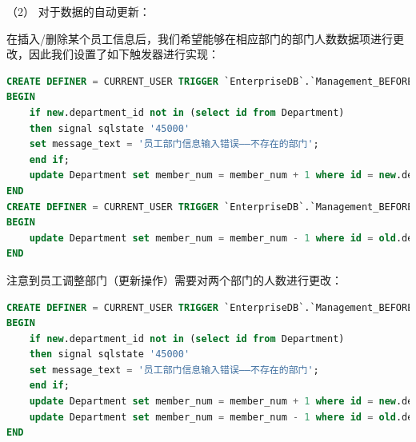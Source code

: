 \documentclass[withoutpreface,bwprint]{cumcmthesis} %
\newcommand{\kuohao}[1]{ \noindent （#1）}
\begin{document}
\vspace{1em}
\kuohao{2} 对于数据的自动更新：

在插入/删除某个员工信息后，我们希望能够在相应部门的部门人数数据项进行更改，因此我们设置了如下触发器进行实现：
\begin{lstlisting}[language=SQL]
CREATE DEFINER = CURRENT_USER TRIGGER `EnterpriseDB`.`Management_BEFORE_INSERT` BEFORE INSERT ON `Management` FOR EACH ROW
BEGIN
	if new.department_id not in (select id from Department)
	then signal sqlstate '45000'
    set message_text = '员工部门信息输入错误——不存在的部门';
	end if;
    update Department set member_num = member_num + 1 where id = new.department_id;
END
CREATE DEFINER = CURRENT_USER TRIGGER `EnterpriseDB`.`Management_BEFORE_DELETE` BEFORE DELETE ON `Management` FOR EACH ROW
BEGIN
	update Department set member_num = member_num - 1 where id = old.department_id;
END
\end{lstlisting}
注意到员工调整部门（更新操作）需要对两个部门的人数进行更改：
\begin{lstlisting}[language=SQL]
CREATE DEFINER = CURRENT_USER TRIGGER `EnterpriseDB`.`Management_BEFORE_UPDATE` BEFORE UPDATE ON `Management` FOR EACH ROW
BEGIN
	if new.department_id not in (select id from Department)
	then signal sqlstate '45000'
    set message_text = '员工部门信息输入错误——不存在的部门';
	end if;
    update Department set member_num = member_num + 1 where id = new.department_id;
	update Department set member_num = member_num - 1 where id = old.department_id;
END
\end{lstlisting}
\end{document}

